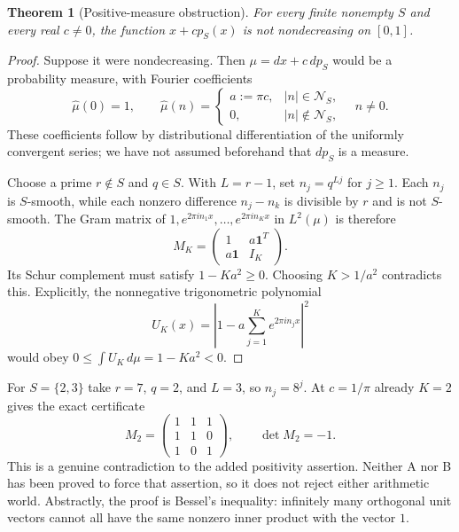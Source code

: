 \documentclass[11pt,a4paper]{article}
\newtheorem{theorem}{Theorem}[section]
\theoremstyle{definition}
\theoremstyle{remark}
\theoremstyle{plain}
\numberwithin{equation}{section}
\begin{document}
\begin{theorem}[Positive-measure obstruction]\label{ra:thm:gram}
For every finite nonempty $S$ and every real $c\ne0$, the function
$x+c p_S(x)$ is not nondecreasing on $[0,1]$.
\end{theorem}
\begin{proof}
Suppose it were nondecreasing. Then $\mu=dx+c\,dp_S$ would be a
probability measure, with Fourier coefficients
\[
 \widehat\mu(0)=1,\qquad
 \widehat\mu(n)=
 \begin{cases}
 a:=\pi c,& |n|\in\mathcal N_S,\\
 0,& |n|\notin\mathcal N_S,
 \end{cases}\quad n\ne0.
\]
These coefficients follow by distributional differentiation of the
uniformly convergent series; we have not assumed beforehand that
$dp_S$ is a measure.

Choose a prime $r\notin S$ and $q\in S$. With $L=r-1$, set
$n_j=q^{Lj}$ for $j\ge1$. Each $n_j$ is $S$-smooth, while each
nonzero difference $n_j-n_k$ is divisible by $r$ and is not
$S$-smooth. The Gram matrix of
$1,e^{2\pi in_1x},\ldots,e^{2\pi in_Kx}$ in $L^2(\mu)$ is therefore
\begin{equation}\label{ra:eq:Gram}
 M_K=\begin{pmatrix}1&a\boldsymbol1^T\\
 a\boldsymbol1&I_K\end{pmatrix}.
\end{equation}
Its Schur complement must satisfy $1-Ka^2\ge0$. Choosing $K>1/a^2$
contradicts this. Explicitly, the nonnegative trigonometric polynomial
\[
 U_K(x)=\left|1-a\sum_{j=1}^K e^{2\pi in_jx}\right|^2
\]
would obey $0\le\int U_K\,d\mu=1-Ka^2<0$.
\end{proof}

For $S=\{2,3\}$ take $r=7$, $q=2$, and $L=3$, so $n_j=8^j$.
At $c=1/\pi$ already $K=2$ gives the exact certificate
\[
 M_2=\begin{pmatrix}1&1&1\\1&1&0\\1&0&1\end{pmatrix},
 \qquad\det M_2=-1.
\]
This is a genuine contradiction to the added positivity assertion.
Neither A nor B has been proved to force that assertion, so it does
not reject either arithmetic world. Abstractly, the proof is Bessel's
inequality: infinitely many orthogonal unit vectors cannot all have
the same nonzero inner product with the vector $1$.
\end{document}
